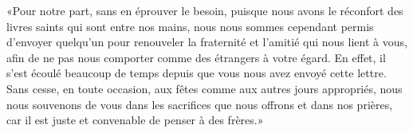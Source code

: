 «Pour notre part, sans en éprouver le besoin,
		puisque nous avons le réconfort des livres saints qui sont entre nos mains,
nous nous sommes cependant permis d’envoyer quelqu’un
	pour renouveler la fraternité et l’amitié qui nous lient à vous,
	afin de ne pas nous comporter comme des étrangers à votre égard.
En effet, il s’est écoulé beaucoup de temps depuis que vous nous avez envoyé cette lettre.
Sans cesse, en toute occasion, aux fêtes comme aux autres jours appropriés,
	nous nous souvenons de vous dans les sacrifices que nous offrons et dans nos prières,
	car il est juste et convenable de penser à des frères.»
